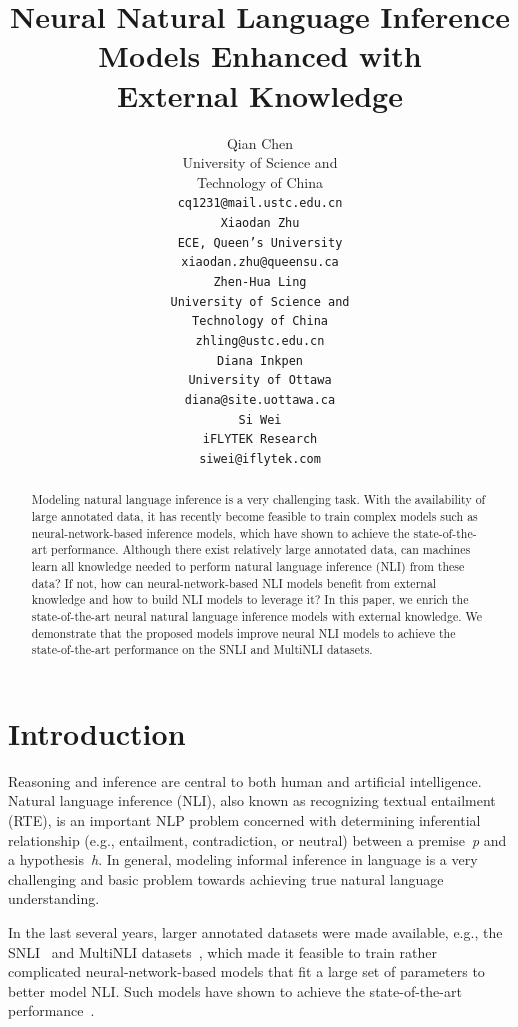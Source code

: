\documentclass[11pt,a4paper]{article}
\title{Neural Natural Language Inference Models Enhanced with \\ External Knowledge}
\author{
Qian Chen \\
University of Science and \\ 
Technology of China\\
\tt{cq1231@mail.ustc.edu.cn} \\\And
Xiaodan Zhu \\
ECE, Queen's University \\
\texttt{xiaodan.zhu@queensu.ca} \\\AND
Zhen-Hua Ling \\
University of Science and \\
Technology of China\\
\tt{zhling@ustc.edu.cn} \\\And
Diana Inkpen \\
University of Ottawa\\
\tt{diana@site.uottawa.ca} \\\AND
Si Wei \\
iFLYTEK Research\\
\tt{siwei@iflytek.com} \\
}
\date{}
\begin{document}
\maketitle
\begin{abstract}
Modeling natural language inference is a very challenging task. With the availability of large annotated data, it has recently become feasible to train complex models such as neural-network-based inference models, which have shown to achieve the state-of-the-art performance.
Although there exist relatively large annotated data, can machines learn all knowledge needed to perform natural language inference (NLI) from these data? If not, how can neural-network-based NLI models benefit from external knowledge and how to build NLI models to leverage it?
In this paper, we enrich the state-of-the-art neural natural language inference models with external knowledge. We demonstrate that the proposed models improve neural NLI models to achieve the state-of-the-art performance on the SNLI and MultiNLI datasets.

\end{abstract}

\section{Introduction}

Reasoning and inference are central to both human and artificial intelligence. Natural language inference (NLI), also known as recognizing textual entailment (RTE), is an important NLP problem concerned with determining inferential relationship (e.g., entailment, contradiction, or neutral) between a premise~\textit{p} and a hypothesis~\textit{h}. In general, modeling informal inference in language is a very challenging and basic problem towards achieving true natural language understanding.

In the last several years, larger annotated datasets were made available, e.g., the SNLI~\citep{DBLP:conf/emnlp/BowmanAPM15} and MultiNLI datasets~\citep{DBLP:journals/corr/WilliamsNB17}, which made it feasible to train rather complicated neural-network-based models that fit a large set of parameters to better model NLI. Such models have shown to achieve the state-of-the-art performance~\citep{DBLP:conf/emnlp/BowmanAPM15,DBLP:conf/acl/BowmanGRGMP16,DBLP:conf/eacl/YuM17,DBLP:conf/emnlp/ParikhT0U16,DBLP:conf/coling/ShaCSL16,DBLP:conf/acl/ChenZLWJI17,DBLP:conf/repeval/ChenZLWJI17,DBLP:journals/corr/abs-1801-00102}. 
\end{document}
